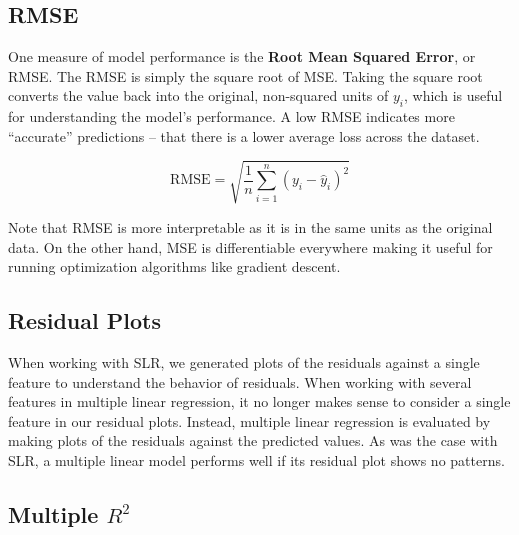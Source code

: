 \documentclass[
  letterpaper,
  DIV=11,
  numbers=noendperiod]{scrreprt}
\begin{document}
\subsection{RMSE}\label{rmse}

One measure of model performance is the \textbf{Root Mean Squared
Error}, or RMSE. The RMSE is simply the square root of MSE. Taking the
square root converts the value back into the original, non-squared units
of \(y_i\), which is useful for understanding the model's performance. A
low RMSE indicates more ``accurate'' predictions -- that there is a
lower average loss across the dataset.

\[\text{RMSE} = \sqrt{\frac{1}{n} \sum_{i=1}^n (y_i - \hat{y}_i)^2}\]

\begin{tcolorbox}[enhanced jigsaw, arc=.35mm, left=2mm, toprule=.15mm, leftrule=.75mm, bottomrule=.15mm, colframe=quarto-callout-note-color-frame, rightrule=.15mm, colbacktitle=quarto-callout-note-color!10!white, opacitybacktitle=0.6, coltitle=black, bottomtitle=1mm, colback=white, toptitle=1mm, title=\textcolor{quarto-callout-note-color}{\faInfo}\hspace{0.5em}{Note}, breakable, opacityback=0, titlerule=0mm]

Note that RMSE is more interpretable as it is in the same units as the
original data. On the other hand, MSE is differentiable everywhere
making it useful for running optimization algorithms like gradient
descent.

\end{tcolorbox}

\subsection{Residual Plots}\label{residual-plots}

When working with SLR, we generated plots of the residuals against a
single feature to understand the behavior of residuals. When working
with several features in multiple linear regression, it no longer makes
sense to consider a single feature in our residual plots. Instead,
multiple linear regression is evaluated by making plots of the residuals
against the predicted values. As was the case with SLR, a multiple
linear model performs well if its residual plot shows no patterns.

\subsection{\texorpdfstring{Multiple
\(R^2\)}{Multiple R\^{}2}}\label{multiple-r2}
\end{document}

